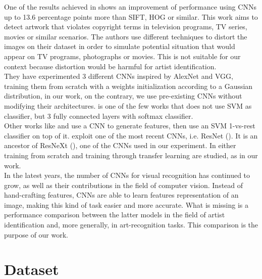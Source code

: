 \documentclass{article}
\begin{document}
One of the results achieved in \cite{hong2017} shows an improvement of performance using CNNs up to 13.6 percentage points more than SIFT, HOG or similar.  This work aims to detect artwork that violates copyright terms in television programs, TV series, movies or similar scenarios. The authors use different techniques to distort the images on their dataset in order to simulate potential situation that would appear on TV programs, photographs or movies. This is not suitable for our context because distortion would be harmful for artist identification.\\
They have experimented 3 different CNNs inspired by AlexNet and VGG, training them from scratch with a weights initialization according to a Gaussian distribution, in our work, on the contrary, we use pre-existing CNNs without modifying their architectures. \cite{hong2017} is one of the few works that does not use SVM as classifier, but 3 fully connected layers with softmax classifier.\\
Other works like \cite{Bar2014} and \cite{razavian2014} use a CNN to generate features, then use an SVM 1-vs-rest classifier on top of it.
\cite{ArtistIdCNN406} exploit one of the most recent CNNs, i.e. ResNet (\cite{resnet}). It is an ancestor of ResNeXt (\cite{resneXt}), one of the CNNs used in our experiment. In \cite{ArtistIdCNN406} either training from scratch and training through transfer learning are studied,  as in our work.
\\

In the latest years, the number of CNNs for visual recognition has continued to grow, as well as their contributions in the field of computer vision. Instead of hand-crafting features, CNNs are able to learn features representation of an image, making this kind of task easier and more accurate. What is missing is a performance comparison between the latter models in the field of artist identification and, more generally, in art-recognition tasks. This comparison is the purpose of our work.


\section{Dataset}\label{dataset}
\end{document}
